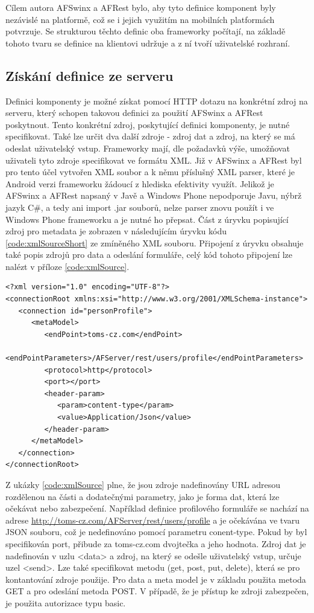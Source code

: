 Cílem autora AFSwinx a AFRest bylo, aby tyto definice komponent byly nezávislé na platformě, což se i jejich využitím na mobilních platformách potvrzuje. Se strukturou těchto definic oba frameworky počítají, na základě tohoto tvaru se definice na klientovi udržuje a z ní tvoří uživatelské rozhraní. 

\subsection{Získání definice ze serveru}
Definici komponenty je možné získat pomocí HTTP dotazu na konkrétní zdroj na serveru, který schopen takovou definici za použití AFSwinx a AFRest poskytnout. Tento konkrétní zdroj, poskytující definici komponenty, je nutné specifikovat. Také lze určit dva další zdroje - zdroj dat a zdroj, na který se má odeslat uživatelský vstup. Frameworky mají, dle požadavků výše, umožňovat uživateli tyto zdroje specifikovat ve formátu XML. Již v AFSwinx a AFRest byl pro tento účel vytvořen XML soubor a k němu příslušný XML parser, které je Android verzi frameworku žádoucí z hlediska efektivity využít. Jelikož je AFSwinx a AFRest napsaný v Javě a Windows Phone nepodporuje Javu, nýbrž jazyk C\#, a tedy ani import .jar souborů, nelze parser znovu použít i ve Windows Phone frameworku a je nutné ho přepsat. Část z úryvku popisující zdroj pro metadata je zobrazen v následujícím úryvku kódu \ref{code:xmlSourceShort} ze zmíněného XML souboru. Připojení z úryvku obsahuje také popis zdrojů pro data a odeslání formuláře, celý kód tohoto připojení lze nalézt v příloze \ref{code:xmlSource}. 

\begin{lstlisting}[caption=Ukázka XML specifikace zdroje pro metadata,
label={code:xmlSourceShort}, basicstyle=\footnotesize]
<?xml version="1.0" encoding="UTF-8"?>
<connectionRoot xmlns:xsi="http://www.w3.org/2001/XMLSchema-instance">
   <connection id="personProfile">
      <metaModel>
         <endPoint>toms-cz.com</endPoint>
         <endPointParameters>/AFServer/rest/users/profile</endPointParameters>
         <protocol>http</protocol>
         <port></port>
         <header-param>
            <param>content-type</param>
            <value>Application/Json</value>
         </header-param>
      </metaModel>
   </connection>
</connectionRoot>
\end{lstlisting}

Z ukázky \ref{code:xmlSource} plne, že jsou zdroje nadefinovány URL adresou rozdělenou na části a dodatečnými parametry, jako je forma dat, která lze očekávat nebo zabezpečení. Například definice profilového formuláře se nachází na adrese \url{http://toms-cz.com/AFServer/rest/users/profile} a je očekávána ve tvaru JSON souboru, což je nedefinováno pomocí parametru conent-type. Pokud by byl specifikován port, přibude za toms-cz.com dvojtečka a jeho hodnota. Zdroj dat je nadefinován v uzlu <data> a zdroj, na který se odešle uživatelský vstup, určuje uzel <send>. Lze také specifikovat metodu (get, post, put, delete), která se pro kontantování zdroje použije. Pro data a meta model je v základu použita metoda GET a pro odeslání metoda POST. V případě, že je přístup ke zdroji zabezpečen, je použita autorizace typu basic.

